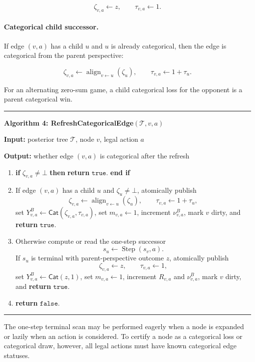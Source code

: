 \documentclass[11pt]{article}
\newcommand{\Tree}{\mathcal{T}}
\newcommand{\Step}{\operatorname{Step}}
\newcommand{\Align}{\operatorname{align}}
\newcommand{\CatObj}{\mathsf{Cat}}
\newenvironment{algorithmblock}[1]
{
  \par\medskip
  \noindent\hrule\par\smallskip
  \noindent\textbf{#1}
  \par\smallskip
}
{
  \par\smallskip\noindent\hrule\par\medskip
}
\newcommand{\Input}{\textbf{Input: }}
\newcommand{\Output}{\textbf{Output: }}
\newcommand{\Return}{\textbf{return }}
\newcommand{\If}{\textbf{if }}
\newcommand{\Then}{\textbf{ then }}
\newcommand{\EndIf}{\textbf{end if}}
\begin{document}
\[
\zeta_{v,a}\gets z,
\qquad
\tau_{v,a}\gets 1.
\]

\paragraph{Categorical child successor.}
If edge \((v,a)\) has a child \(u\) and \(u\) is already categorical, then the
edge is categorical from the parent perspective:

\[
\zeta_{v,a}\gets \Align_{v\leftarrow u}(\zeta_u),
\qquad
\tau_{v,a}\gets 1+\tau_u.
\]

For an alternating zero-sum game, a child categorical loss for the opponent is a
parent categorical win.

\begin{algorithmblock}{Algorithm 4: RefreshCategoricalEdge\((\Tree,v,a)\)}

\Input posterior tree \(\Tree\), node \(v\), legal action \(a\)

\Output whether edge \((v,a)\) is categorical after the refresh

\begin{enumerate}[leftmargin=2em]
  \item \If \(\zeta_{v,a}\ne\bot\) \Then \Return \(\texttt{true}\). \EndIf

  \item If edge \((v,a)\) has a child \(u\) and \(\zeta_u\ne\bot\), atomically
  publish
  \[
  \zeta_{v,a}\gets\Align_{v\leftarrow u}(\zeta_u),
  \qquad
  \tau_{v,a}\gets 1+\tau_u,
  \]
  set \(Y^B_{v,a}\gets\CatObj(\zeta_{v,a},\tau_{v,a})\), set \(m_{v,a}\gets1\),
  increment \(\nu^B_{v,a}\), mark \(v\) dirty, and \Return \(\texttt{true}\).

  \item Otherwise compute or read the one-step successor
  \[
  s_u\gets\Step(s_v,a).
  \]
  If \(s_u\) is terminal with parent-perspective outcome \(z\), atomically
  publish
  \[
  \zeta_{v,a}\gets z,
  \qquad
  \tau_{v,a}\gets 1,
  \]
  set \(Y^B_{v,a}\gets\CatObj(z,1)\), set \(m_{v,a}\gets1\), increment
  \(R_{v,a}\) and \(\nu^B_{v,a}\), mark \(v\) dirty, and \Return
  \(\texttt{true}\).

  \item \Return \(\texttt{false}\).
\end{enumerate}

\end{algorithmblock}

The one-step terminal scan may be performed eagerly when a node is expanded or
lazily when an action is considered. To certify a node as a categorical loss or
categorical draw, however, all legal actions must have known categorical edge
statuses.
\end{document}
